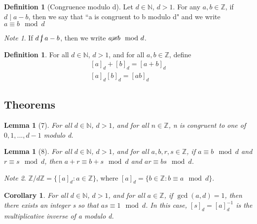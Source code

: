 \documentclass[12pt]{article}
\newtheorem{lem}[thm]{Lemma}  %
\newtheorem{cor}[thm]{Corollary}
\theoremstyle{definition}
\newtheorem{defn}[thm]{Definition}
\theoremstyle{remark}
\newtheorem*{note}{Note} %
\numberwithin{equation}{section}
\newcommand\Z{\mathbb Z}    %
\newcommand\N{\mathbb N}    %
\begin{document}
\begin{defn}[Congruence modulo d]
        Let $d \in \N$, $d >1$. For any $a,b \in \Z$, if $d\;\vert\;a-b$, then we say that ``a is congruent to b modulo d" and we write $a \equiv b \mod d$
\end{defn}


\begin{note}
        If $d\;\cancel{\vert}\;a-b$, then we write $a \cancel{\equiv}b\mod d$.
\end{note}



\begin{defn}
        For all $d \in \N$, $d >1$, and for all $a,b \in \Z$, define 
        \begin{equation}
                \begin{array}{c}
                        [a]_d+[b]_d=[a+b]_d \\
                        {}[a]_d[b]_d = [ab]_d
                \end{array}
        \end{equation}
\end{defn}




\subsection{Theorems}


\begin{lem}[7]
        For all $d \in \N$, $d > 1$, and for all $n \in \Z$, n is congruent to one of $0,1,...,d-1$ modulo d.
\end{lem}


\begin{lem}[8]
        For all $d \in \N$, $d > 1$, and for all $a,b,r,s \in \Z$, if $a \equiv b\mod d$ and $r \equiv s \mod d$, then $a + r\equiv b + s\mod d$ and $ar\equiv bs \mod d$.
\end{lem}

\begin{note}
        $\Z/d\Z = \{[a]_d:a \in \Z\}$, where $[a]_d = \{b \in \Z: b \equiv a \mod d\}$.
\end{note}


\begin{cor}
        For all $d \in \N$, $d > 1$, and for all $a\in \Z$, if $\gcd(a,d) = 1$, then there exists an integer s so that $as \equiv 1 \mod d$. In this case, $[s]_d = [a]_d^{-1}$ is the multiplicative inverse of a modulo d. 
\end{cor}
\end{document}
